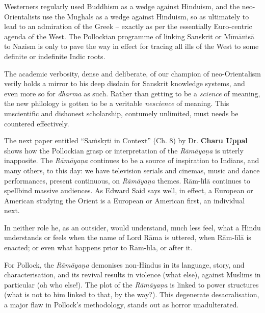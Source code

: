 Westerners regularly used Buddhism as a wedge against Hinduism, and the neo-Orientalists use the Mughals as a wedge against Hinduism, so as ultimately to lead to an admiration of the Greek – exactly as per the essentially Euro-centric agenda of the West. The Pollockian programme of linking Sanskrit or Mīmāṁsā to Nazism is only to pave the way in effect for tracing all ills of the West to some definite or indefinite Indic roots.

\vskip 2pt

The academic verbosity, dense and deliberate, of our champion of neo-Orientalism verily holds a mirror to his deep disdain for Sanskrit knowledge systems, and even more so for \textit{dharma} as such. Rather than getting to be a \textit{science} of meaning, the new philology is gotten to be a veritable \textit{nescience} of meaning. This unscientific and dishonest scholarship, contumely unlimited, must needs be countered effectively.

\vskip 2pt

The next paper entitled “Saṁskṛti in Context” (Ch. 8) by Dr. \textbf{Charu Uppal} shows how the Pollockian grasp or interpretation of the \textit{Rāmāyaṇa} is utterly inapposite. The \textit{Rāmāyaṇa} continues to be a source of inspiration to Indians, and many others, to this day: we have television serials and cinemas, music and dance performances, present continuous, on \textit{Rāmāyaṇa} themes. Rām-līlā continues to spellbind massive audiences. As Edward Said says well, in effect, a European or American studying the Orient is a European or American first, an individual next.

\vskip -2pt

In neither role he, as an outsider, would understand, much less feel, what a Hindu understands or feels when the name of Lord Rāma is uttered, when Rām-līlā is enacted; or even what happens prior to Rām-līlā, or after it.

\vskip -2pt

For Pollock, the \textit{Rāmāyaṇa} demonises non-Hindus in its language, story, and characterisation, and its revival results in violence (what else), against Muslims in particular (oh who else!). The plot of the \textit{Rāmāyaṇa} is linked to power structures (what is not to him linked to that, by the way?). This degenerate desacralisation, a major flaw in Pollock’s methodology, stands out as horror unadulterated.

